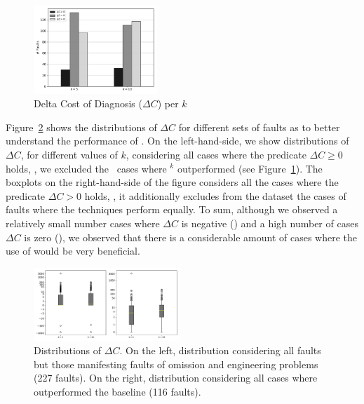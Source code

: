 \documentclass{article}
\begin{document}
\begin{figure}[h]
	\vspace{-0.3cm}
		\centering
		\includegraphics[width=0.415\textwidth]{figures/performance.pdf}
		\vspace{-0.4cm}
		\caption{Delta Cost of Diagnosis ($\Delta{}C$) per $k$}
		\label{fig:diagnosis}
\end{figure}


Figure~\ref{fig:boxplot} shows the distributions of $\Delta{}C$ for
different sets of faults as to better understand the performance of
. 
On the left-hand-side, we show distributions of
$\Delta{}C$, for different values of $k$, considering all cases where
the predicate $\Delta{}C\geq{}0$ holds, \ie{}, we excluded the
\numOutPerformed\ cases where \sfl{}$^{k}$ outperformed 
(see Figure~\ref{fig:diagnosis}). The boxplots on the right-hand-side
of the figure considers all the cases where the predicate
$\Delta{}C>0$ holds, \ie{}, it additionally excludes from the dataset
the cases of faults where the techniques perform equally.
 To sum,
although we observed a relatively small number cases where $\Delta{}C$
is negative (\numOutPerformed) and a high number of cases $\Delta{}C$
is zero (\numEquallyPerformed), we observed that there is a
considerable amount of cases where the use of  would be
very beneficial.

\begin{figure}[h]
		\vspace{-0.2cm}
		\centering
		\includegraphics[width=0.49\textwidth]{figures/boxplot.pdf}
		\vspace{-0.6cm}

		\caption{Distributions of $\Delta{}C$. On the left, distribution
        considering all faults but those manifesting faults of
        omission and engineering problems (227 faults). On the right,
        distribution considering all cases where 
        outperformed the baseline (116 faults).}
		\label{fig:boxplot}
		\vspace{-0.2cm}
\end{figure}
\end{document}
